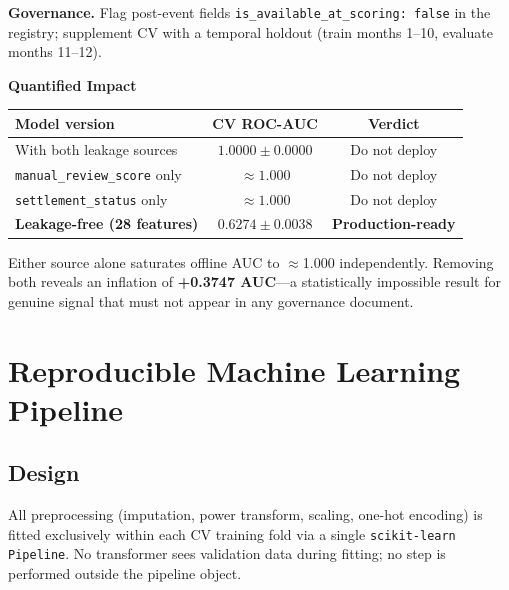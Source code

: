 \documentclass[10pt,a4paper]{article}
\begin{document}
\textbf{Governance.} Flag post-event fields
\texttt{is\_available\_at\_scoring: false} in the registry; supplement CV
with a temporal holdout (train months 1--10, evaluate months 11--12).

\vspace{3pt}
\begin{mdframed}[linewidth=0.5pt,innerleftmargin=5pt,innerrightmargin=5pt,
  innertopmargin=3pt,innerbottommargin=3pt,skipabove=2pt,skipbelow=2pt]
\centering\fontsize{7.5}{9}\selectfont
\textbf{Quantified Impact}\\[3pt]
\begin{tabular}{lcc}
\toprule
\textbf{Model version} & \textbf{CV ROC-AUC} & \textbf{Verdict} \\
\midrule
With both leakage sources   & $1.0000\pm0.0000$ & Do not deploy \\
\texttt{manual\_review\_score} only & ${\approx}1.000$ & Do not deploy \\
\texttt{settlement\_status} only & ${\approx}1.000$ & Do not deploy \\
\textbf{Leakage-free (28 features)} & $\mathbf{0.6274\pm0.0038}$ &
  \textbf{Production-ready} \\
\bottomrule
\end{tabular}
\vspace{2pt}

\footnotesize
Either source alone saturates offline AUC to $\approx$1.000 independently.
Removing both reveals an inflation of \textbf{+0.3747 AUC}---a statistically
impossible result for genuine signal that must not appear in any governance
document.
\end{mdframed}

\section{Reproducible Machine Learning Pipeline}
\label{sec:pipeline}

\subsection*{Design}

All preprocessing (imputation, power transform, scaling, one-hot encoding)
is fitted exclusively within each CV training fold via a single
\texttt{scikit-learn Pipeline}. No transformer sees validation data during
fitting; no step is performed outside the pipeline object.
\end{document}
